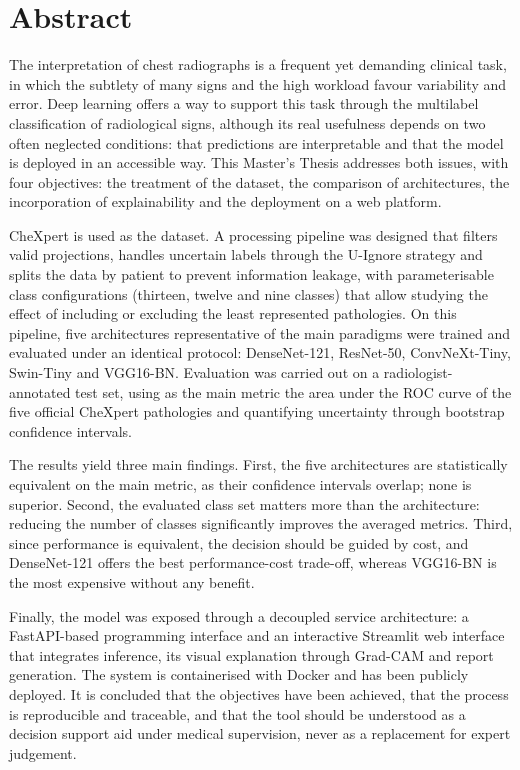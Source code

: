 %

\section*{Abstract}
\label{sec::abstract}

The interpretation of chest radiographs is a frequent yet demanding clinical task, in
which the subtlety of many signs and the high workload favour variability and error.
Deep learning offers a way to support this task through the multilabel classification
of radiological signs, although its real usefulness depends on two often neglected
conditions: that predictions are interpretable and that the model is deployed in an
accessible way. This Master's Thesis addresses both issues, with four objectives: the
treatment of the dataset, the comparison of architectures, the incorporation of
explainability and the deployment on a web platform.

CheXpert is used as the dataset. A processing pipeline was designed that filters valid
projections, handles uncertain labels through the U-Ignore strategy and splits the data
by patient to prevent information leakage, with parameterisable class configurations
(thirteen, twelve and nine classes) that allow studying the effect of including or
excluding the least represented pathologies. On this pipeline, five architectures
representative of the main paradigms were trained and evaluated under an identical
protocol: DenseNet-121, ResNet-50, ConvNeXt-Tiny, Swin-Tiny and VGG16-BN. Evaluation
was carried out on a radiologist-annotated test set, using as the main metric the area
under the ROC curve of the five official CheXpert pathologies and quantifying
uncertainty through bootstrap confidence intervals.

The results yield three main findings. First, the five architectures are statistically
equivalent on the main metric, as their confidence intervals overlap; none is superior.
Second, the evaluated class set matters more than the architecture: reducing the number
of classes significantly improves the averaged metrics. Third, since performance is
equivalent, the decision should be guided by cost, and DenseNet-121 offers the best
performance-cost trade-off, whereas VGG16-BN is the most expensive without any benefit.

Finally, the model was exposed through a decoupled service architecture: a FastAPI-based
programming interface and an interactive Streamlit web interface that integrates
inference, its visual explanation through Grad-CAM and report generation. The system is
containerised with Docker and has been publicly deployed. It is concluded that the
objectives have been achieved, that the process is reproducible and traceable, and that
the tool should be understood as a decision support aid under medical supervision, never
as a replacement for expert judgement.



